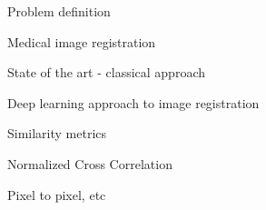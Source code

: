 Problem definition


Medical image registration


State of the art - classical approach



Deep learning approach to image registration




Similarity metrics

Normalized Cross Correlation

Pixel to pixel, etc